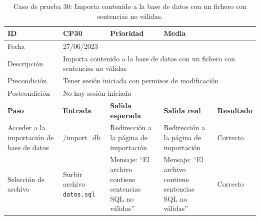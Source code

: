 \begin{table}[H]
\small
\begin{tabular}{p{} p{} p{} p{} p{}}
\cellcolor{gray!25}
ID   & CP30 & \cellcolor{gray!25} Prioridad   & Media \\ \hline
\cellcolor{gray!25} Fecha	&	\multicolumn{4}{l}{27/06/2023} \\ \hline
\cellcolor{gray!25} Descripción		&	\multicolumn{4}{p{.66\textwidth}}{Importa contenido a la base de datos con un fichero con sentencias no válidas} \\ \hline                                            
\cellcolor{gray!25}
Precondición  & \multicolumn{4}{p{.66\textwidth}}{Tener sesión iniciada con permisos de modificación} \\ \hline
\cellcolor{gray!25} Postcondición & \multicolumn{4}{l}{No hay sesión iniciada}                                                    \\ \hline
\rowcolor{gray!25}
\textbf{Paso}   & \textbf{Entrada} & \textbf{Salida esperada} & \textbf{Salida real} & \textbf{Resultado} \\ \hline
Acceder a la importación de base de datos
& /import\_db                                                                          
& Redirección a la página de importación                              
& Redirección a la página de importación                               
& Correcto                            
\\ \hline
Selección de archivo
& Surbir archivo \texttt{datos.sql}                                                                       
& Mensaje: ``El archivo contiene sentencias SQL no válidas''                             
& Mensaje: ``El archivo contiene sentencias SQL no válidas''                                
& Correcto                            
\\ \hline
\end{tabular}
\caption{Caso de prueba 30: Importa contenido a la base de datos con un fichero con sentencias no válidas.}\label{table:CP30}
\end{table}

